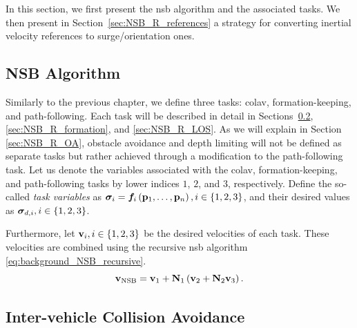 In this section, we first present the \gls{nsb} algorithm and the associated tasks.
We then present in Section~\ref{sec:NSB_R_references} a strategy for converting inertial velocity references to surge/orientation ones.

\subsection{NSB Algorithm}
\label{sec:NSB_R_NSB}

Similarly to the previous chapter, we define three tasks: \gls{colav}, formation-keeping, and path-following.
Each task will be described in detail in Sections~\ref{sec:NSB_R_COLAV}, \ref{sec:NSB_R_formation}, and \ref{sec:NSB_R_LOS}.
As we will explain in Section \ref{sec:NSB_R_OA}, obstacle avoidance and depth limiting will not be defined as separate tasks but rather achieved through a modification to the path-following task.
Let us denote the variables associated with the \gls{colav}, formation-keeping, and path-following tasks by lower indices $1$, $2$, and $3$, respectively.
Define the so-called \emph{task variables} as $\bm{\sigma}_i = \bm{f}_i\left(\mathbf{p}_1, \ldots, \mathbf{p}_n\right), i \in \left\{1,2,3\right\}$, and their desired values as $\bm{\sigma}_{d,i}, i \in \left\{1,2,3\right\}$.

Furthermore, let $\mathbf{v}_i, i \in \left\{1,2,3\right\}$ be the desired velocities of each task.    
These velocities are combined using the recursive \gls{nsb} algorithm \eqref{eq:background_NSB_recursive}.
\begin{equation} 
    \mathbf{v}_{\rm NSB} = \mathbf{v}_1 + \mathbf{N}_1\left(\mathbf{v}_2 + \mathbf{N}_2\mathbf{v}_3\right). \label{eq:NSB_R_NSB_with_COLAV}
\end{equation}

\subsection{Inter-vehicle Collision Avoidance}
\label{sec:NSB_R_COLAV}

